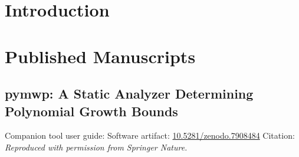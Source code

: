 \dedication{}

\begin{abstract}

\end{abstract}

\mainmatter

\chapter{Introduction}\label{introduction}


\chapter{Published Manuscripts}\label{published-manuscripts}

\clearpage
\section{pymwp: A Static Analyzer Determining Polynomial Growth Bounds}\label{sec:atva}
{\noindent Companion tool user guide: 
\newline\noindent Software artifact: \href{https://doi.org/10.5281/zenodo.7908484}{10.5281/zenodo.7908484}
\newline\noindent Citation:~\cite{aubert2023b}
\newline\newline\textit{Reproduced with permission from Springer Nature.}}

